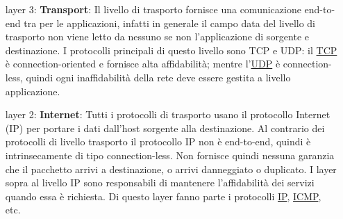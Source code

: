 \begin{enumerate}
    \item[layer 3:] \textbf{Transport}: Il livello di trasporto fornisce una comunicazione end-to-end tra per le applicazioni, infatti in generale il campo data del livello di trasporto non viene letto da nessuno se non l'applicazione di sorgente e destinazione. I protocolli principali di questo livello sono TCP e UDP: il \href{https://en.wikipedia.org/wiki/Transmission_Control_Protocol}{TCP} è connection-oriented e fornisce alta affidabilità; mentre l'\href{https://en.wikipedia.org/wiki/User_Datagram_Protocol}{UDP} è connection-less, quindi ogni inaffidabilità della rete deve essere gestita a livello applicazione.

    \item[layer 2:] \textbf{Internet}: Tutti i protocolli di trasporto usano il protocollo Internet (IP) per portare i dati dall'host sorgente alla destinazione. Al contrario dei protocolli di livello trasporto il protocollo IP non è end-to-end, quindi è intrinsecamente di tipo connection-less. Non fornisce quindi nessuna garanzia che il pacchetto arrivi a destinazione, o arrivi danneggiato o duplicato. I layer sopra al livello IP sono responsabili di mantenere l'affidabilità dei servizi quando essa è richiesta. Di questo layer fanno parte i protocolli \href{https://en.wikipedia.org/wiki/Internet_Protocol}{IP}, \href{https://en.wikipedia.org/wiki/Internet_Control_Message_Protocol}{ICMP}, etc.

\end{enumerate}
